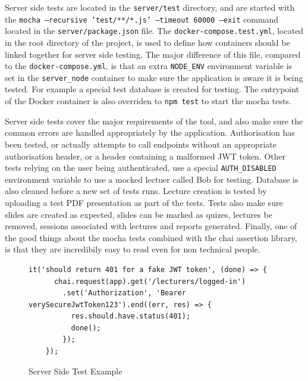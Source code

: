 Server side tests are located in the \texttt{server/test} directory, and are started with the
\texttt{mocha --recursive 'test/**/*.js' --timeout 60000 --exit} command located in the \texttt{server/package.json}
file. The \texttt{docker-compose.test.yml}, located in the root directory of the project, is used to define
how containers should be linked together for server side testing. The major difference of this file, compared
to the \texttt{docker-compose.yml}, is that an extra \texttt{NODE\_ENV} environment variable is set
in the \texttt{server\_node} container to make sure the application is aware it is being tested.
For example a special test database is created for testing. The entrypoint of the Docker container
is also overriden to \texttt{npm test} to start the mocha tests.

Server side tests cover the major requirements of the tool, and also make sure the common errors
are handled appropriately by the application. Authorisation has been tested, or actually attempts
to call endpoints without an appropriate authorisation header, or a header containing a malformed
JWT token. Other tests relying on the user being authenticated, use a special \texttt{AUTH\_DISABLED}
environment variable to use a mocked lectuer called Bob for testing. Database is also
cleaned before a new set of tests runs. Lecture creation is tested by uploading a test PDF
presentation as part of the tests. Tests also make sure slides are created as expected, slides
can be marked as quizes, lectures be removed, sessions associated with lectures and reports
generated. Finally, one of the good things about the mocha tests combined
with the chai assertion library, is that they are incredibily easy to read even for non technical
people.

\begin{figure}[h!]
  \begin{lstlisting}[basicstyle=\small, breaklines=true]
  it('should return 401 for a fake JWT token', (done) => {
      chai.request(app).get('/lecturers/logged-in')
        .set('Authorization', 'Bearer verySecureJwtToken123').end((err, res) => {
          res.should.have.status(401);
          done();
        });
    });
  \end{lstlisting}
  \caption{Server Side Test Example}
  \label{sample:servertest}
\end{figure}

